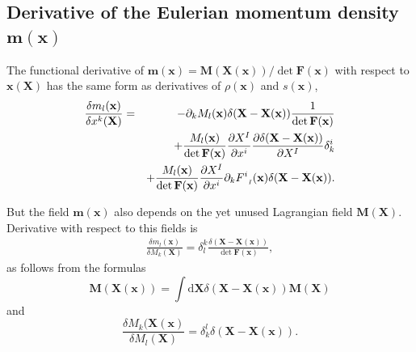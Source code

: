 \documentclass[
10pt, %
a4paper, %
oneside, %
headinclude,footinclude, %
BCOR5mm, %
]{scrartcl}
\newcommand{\xx}{\mathbf{x}}
\newcommand{\XX}{\mathbf{X}}
\newcommand{\dX}{\mathrm{d}\XX}
\newcommand{\mm}{\mathbf{m}}
\newcommand{\MM}{\mathbf{M}}
\newcommand{\FF}{\mathbf{F}}
\newcommand{\F}[2]{F^{#1}_{\ \, \mathsmaller#2}}
\begin{document}
\subsection{Derivative of the Eulerian momentum density $\mm(\xx)$}
The functional derivative of $\mm(\xx)=\MM(\XX(\xx))/\det \FF(\xx)$ with respect to $\xx(\XX)$ has the same form as derivatives of $\rho(\xx)$ and $s(\xx)$,
\begin{eqnarray}
	\frac{\delta m_l(\xx)}{\delta x^k(\XX)}&=&
	-\partial_k M_l(\xx) \delta(\XX-\XX(\xx))\frac{1}{\det\FF(\xx)}\nonumber\\
	&&
	+\frac{M_l(\xx)}{\det \FF(\xx)} \frac{\partial X^I}{\partial x^i} \frac{\partial \delta(\XX-\XX(\xx))}{\partial X^I}\delta^i_k \nonumber\\
	&&+\frac{M_l(\xx)}{\det \FF(\xx)} \frac{\partial X^I}{\partial x^i} \partial_k 
	\F{i}{I}(\xx)\delta(\XX-\XX(\xx)).
\end{eqnarray}

But the field $\mm(\xx)$ also depends on the yet unused Lagrangian field $\MM(\XX)$. Derivative with respect to this fields is
\begin{eqnarray}\label{eq.mM}
	\frac{\delta m_l(\xx)}{\delta M_k(\XX)} = \delta^k_l \frac{\delta(\XX-\XX(\xx))}{\det\FF(\xx)},
\end{eqnarray}
as follows from the formulas 
\begin{equation}
    \MM(\XX(\xx)) = \int\dX \delta(\XX-\XX(\xx)) \MM(\XX)
\end{equation}
and
\begin{equation}
    \frac{\delta M_k(\XX(\xx)}{\delta M_l(\XX)} = \delta^l_k \delta(\XX-\XX(\xx)).
\end{equation}
\end{document}
